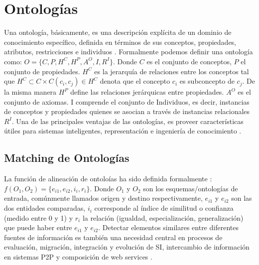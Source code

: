 \section{Ontolog\'ias} \label{subsec:ontology}

Una ontolog\'ia, b\'asicamente, es una descripci\'on expl\'icita de un dominio de conocimiento espec\'ifico, definida en t\'erminos de sus conceptos, propiedades, atributos, restricciones e individuos \cite{Noy:2001}. Formalmente podemos definir una ontolog\'ia como: $O = \lbrace C, P, H^{C}, H^{P}, A^{O}, I, R^{I} \rbrace$. Donde $C$ es el conjunto de conceptos, $P$ el conjunto de propiedades. $H^{C}$ es la jerarqu\'ia de relaciones entre los conceptos tal que $H^{C} \subset C \times C (c_{i},c_{j}) \in H^{C}$ denota que el concepto $c_{i}$ es subconcepto de $c_{j}$. De la misma manera $H^{P}$ define las relaciones jer\'arquicas entre propiedades. $A^{O}$ es el conjunto de axiomas. I comprende el conjunto de Individuos, es decir, instancias de conceptos y propiedades quienes se asocian a trav\'es de instancias relacionales $R^{I}$. Una de las principales ventajas de las ontolog\'ias, es proveer caracter\'isticas \'utiles para sistemas inteligentes, representaci\'on e ingenier\'ia de conocimiento \cite{Gasevic:2009}.

\subsection{Matching de Ontolog\'ias} \label{subsec:matching}

La funci\'on de alineaci\'on de ontolo\'ias ha sido definida formalmente \cite{Euzenat:2007, Gal:2009}: $f(O_{1},O_{2}) = \lbrace e_{i1}, e_{i2}, i_{i}, r_{i}\rbrace$. Donde $O_{1}$ y $O_{2}$ son los esquemas/ontolog\'ias de entrada, com\'unmente llamados origen y destino respectivamente, $e_{i1}$ y $e_{i2}$ son las dos entidades comparadas, $i_{i}$ corresponde al \'indice de similitud o confianza (medido entre 0 y 1) y $r_{i}$ la relaci\'on (igualdad, especializaci\'on, generalizaci\'on) que puede haber entre $e_{i1}$ y $e_{i2}$. Detectar elementos similares entre diferentes fuentes de informaci\'on es tambi\'en una necesidad central en procesos de evaluaci\'on, migraci\'on, integraci\'on y evoluci\'on de SI, intercambio de informaci\'on en sistemas P2P y composici\'on de web services \cite{Euzenat:2007}.

